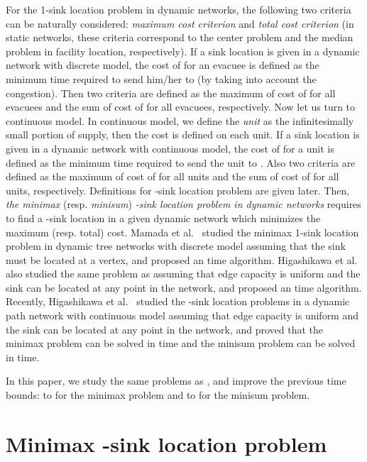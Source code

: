 \documentclass[a4paper]{llncs}
\begin{document}
For the 1-sink location problem in dynamic networks, the following two criteria can be naturally considered: {\it maximum cost criterion} and {\it total cost criterion}
(in static networks, these criteria correspond to the center problem and the median problem in facility location, respectively).
If a sink location  is given in a dynamic network with discrete model, 
the cost of  for an evacuee is defined as the minimum time required to send him/her to 
(by taking into account the congestion).
Then two criteria are defined as the maximum of cost of  for all evacuees and the sum of cost of  for all evacuees, respectively.
Now let us turn to continuous model. 
In continuous model, we define the {\it unit} as the infinitesimally small portion of supply,
then the cost is defined on each unit.
If a sink location  is given in a dynamic network with continuous model, 
the cost of  for a unit is defined as the minimum time required to send the unit to .
Also two criteria are defined as the maximum of cost of  for all units and the sum of cost of  for all units, respectively.
Definitions for -sink location problem are given later.
Then, {\it the minimax} (resp. {\it minisum}) {\it -sink location problem in dynamic networks} requires to find a -sink location in a given dynamic network which minimizes the maximum (resp. total) cost.
Mamada et al.~\cite{mumf06} studied the minimax 1-sink location problem in dynamic tree networks with discrete model assuming that the sink must be located at a vertex,
and proposed an  time algorithm. 
Higashikawa et al.~\cite{hgk14} also studied the same problem as \cite{mumf06} assuming that edge capacity is uniform and the sink can be located at any point in the network,
and proposed an  time algorithm. 
Recently, Higashikawa et al.~\cite{hgk14_2} studied the -sink location problems in a dynamic path network with continuous model assuming that edge capacity is uniform and the sink can be located at any point in the network, and proved that the minimax problem can be solved in  time and the minisum problem can be solved in  time.

In this paper, we study the same problems as \cite{hgk14_2}, and improve the previous time bounds: 
 to  for the minimax problem and  to  for the minisum problem.





\section{Minimax -sink location problem}
\label{sec:minimax}
\end{document}

